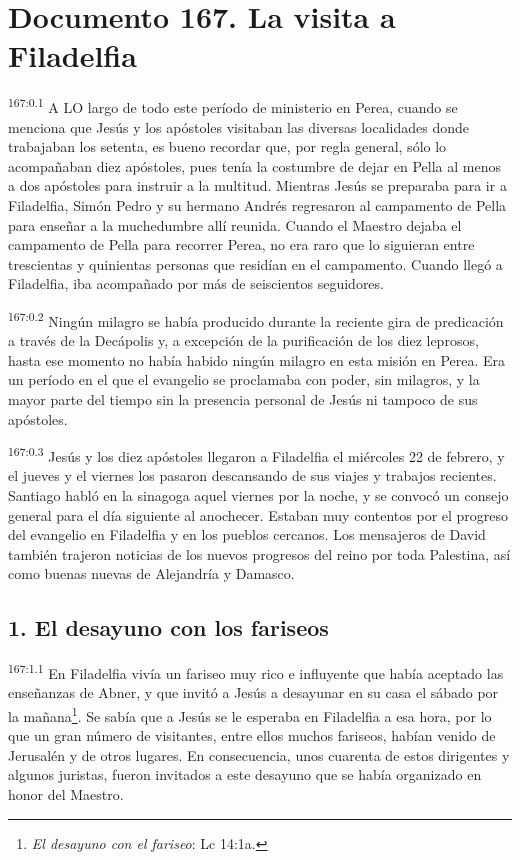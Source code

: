 \chapter{Documento 167. La visita a Filadelfia}
\par
\textsuperscript{167:0.1} A LO largo de todo este período de ministerio en Perea, cuando se menciona que Jesús y los apóstoles visitaban las diversas localidades donde trabajaban los setenta, es bueno recordar que, por regla general, sólo lo acompañaban diez apóstoles, pues tenía la costumbre de dejar en Pella al menos a dos apóstoles para instruir a la multitud. Mientras Jesús se preparaba para ir a Filadelfia, Simón Pedro y su hermano Andrés regresaron al campamento de Pella para enseñar a la muchedumbre allí reunida. Cuando el Maestro dejaba el campamento de Pella para recorrer Perea, no era raro que lo siguieran entre trescientas y quinientas personas que residían en el campamento. Cuando llegó a Filadelfia, iba acompañado por más de seiscientos seguidores.

\par
\textsuperscript{167:0.2} Ningún milagro se había producido durante la reciente gira de predicación a través de la Decápolis y, a excepción de la purificación de los diez leprosos, hasta ese momento no había habido ningún milagro en esta misión en Perea. Era un período en el que el evangelio se proclamaba con poder, sin milagros, y la mayor parte del tiempo sin la presencia personal de Jesús ni tampoco de sus apóstoles.

\par
\textsuperscript{167:0.3} Jesús y los diez apóstoles llegaron a Filadelfia el miércoles 22 de febrero, y el jueves y el viernes los pasaron descansando de sus viajes y trabajos recientes. Santiago habló en la sinagoga aquel viernes por la noche, y se convocó un consejo general para el día siguiente al anochecer. Estaban muy contentos por el progreso del evangelio en Filadelfia y en los pueblos cercanos. Los mensajeros de David también trajeron noticias de los nuevos progresos del reino por toda Palestina, así como buenas nuevas de Alejandría y Damasco.

\section*{1. El desayuno con los fariseos}
\par
\textsuperscript{167:1.1} En Filadelfia vivía un fariseo muy rico e influyente que había aceptado las enseñanzas de Abner, y que invitó a Jesús a desayunar en su casa el sábado por la mañana\footnote{\textit{El desayuno con el fariseo}: Lc 14:1a.}. Se sabía que a Jesús se le esperaba en Filadelfia a esa hora, por lo que un gran número de visitantes, entre ellos muchos fariseos, habían venido de Jerusalén y de otros lugares. En consecuencia, unos cuarenta de estos dirigentes y algunos juristas, fueron invitados a este desayuno que se había organizado en honor del Maestro.

